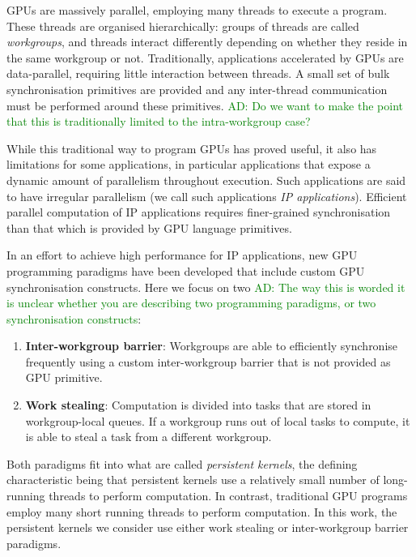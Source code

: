 \documentclass[nocopyrightspace]{sigplanconf-pldi16}
\newcommand{\ADComment}[1]{\textcolor{green}{AD: #1}}
\begin{document}
GPUs are massively parallel, employing many threads to execute a
program.  These threads are organised hierarchically: groups of threads
are called \emph{workgroups}, and threads interact differently depending on whether they reside in the same workgroup or not.  Traditionally, applications accelerated by GPUs are
data-parallel, requiring little interaction between threads. A small
set of bulk synchronisation primitives are provided and any
inter-thread communication must be performed around these primitives.  \ADComment{Do we want to make the point that this is traditionally limited to the intra-workgroup case?}

While this traditional way to program GPUs has proved useful, it also
has limitations for some applications, in particular applications that
expose a dynamic amount of parallelism throughout execution. Such
applications are said to have irregular parallelism (we call such
applications \emph{IP applications}). Efficient parallel computation
of IP applications requires finer-grained synchronisation than that
which is provided by GPU language primitives.

In an effort to achieve high performance for IP applications, new GPU
programming paradigms have been developed that include custom GPU
synchronisation constructs. Here we focus on two \ADComment{The way this is worded it is unclear whether you are describing two programming paradigms, or two synchronisation constructs}:

\begin{enumerate}
\item {\bf Inter-workgroup barrier}: Workgroups are able to
  efficiently synchronise frequently using a custom inter-workgroup
  barrier that is not provided as GPU primitive.

\item {\bf Work stealing}: Computation is divided into tasks that are
  stored in workgroup-local queues. If a workgroup runs out of local
  tasks to compute, it is able to steal a task from a different
  workgroup.
\end{enumerate}

Both paradigms fit into what are called \emph{persistent kernels}, the
defining characteristic being that persistent kernels use a relatively
small number of long-running threads to perform computation. In
contrast, traditional GPU programs employ many short running threads
to perform computation. In this work, the persistent kernels we consider
use either work stealing or inter-workgroup barrier paradigms.
\end{document}
